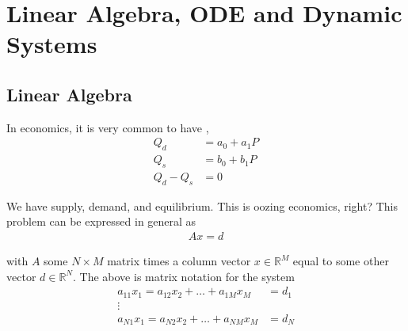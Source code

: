 \documentclass{article}
\begin{document}
\displayoptions

\section{Linear Algebra, ODE and Dynamic Systems}
\label{sec:linear_algebra_ode_and_dynamic_systems}

\localtableofcontents

\subsection{Linear Algebra}
\label{sub:linear_algebra}


In economics, it is very common to have ,
\begin{equation}
  \begin{array}{rl}
    Q_d & = a_0 + a_1 P \\
    Q_s & = b_0 + b_1 P \\
    Q_d  - Q_s & = 0
  \end{array}
  \label{eq:lecture6_supply_demand}
\end{equation}

We have supply, demand, and equilibrium. This is oozing economics, right? This problem can be expressed in general as
\begin{align*}
  A x = d
\end{align*}

with $A$ some $N \times M$ matrix times a column vector $x \in \mathbb{R}^M$ equal to some other vector $d \in \mathbb{R}^N$. The above is matrix notation for the system
\begin{equation}
  \begin{array}{rl}
    a_{11} x_1 = a_{12} x_2 + \ldots + a_{1M} x_M & = d_1 \\
    \vdots \\
    a_{N1} x_1 = a_{N2} x_2 + \ldots + a_{NM} x_M & = d_N
  \end{array}
  \nonumber
\end{equation}
\end{document}
